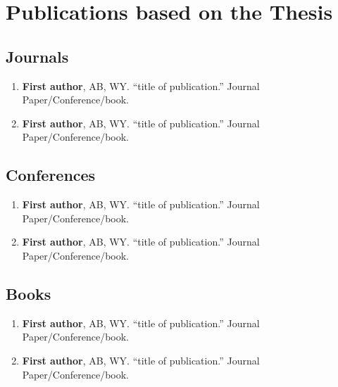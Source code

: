 \chapter[Publications based on the Thesis]
{Publications based on the Thesis}
\label{chap:pubs}
\section{Journals}
\begin{enumerate}
  \item \textbf{First author}, AB, WY. ``title of publication.'' Journal Paper/Conference/book.
  \item \textbf{First author}, AB, WY. ``title of publication.'' Journal Paper/Conference/book.
  
\end{enumerate}
\section{Conferences}
\begin{enumerate}
  \item \textbf{First author}, AB, WY. ``title of publication.'' Journal Paper/Conference/book.
  \item \textbf{First author}, AB, WY. ``title of publication.'' Journal Paper/Conference/book.
\end{enumerate}
\section{Books}
\begin{enumerate}
  \item \textbf{First author}, AB, WY. ``title of publication.'' Journal Paper/Conference/book.
  \item \textbf{First author}, AB, WY. ``title of publication.'' Journal Paper/Conference/book.
\end{enumerate}